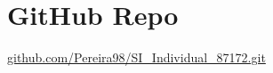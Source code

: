 \documentclass[12pt]{article}
\begin{document}


\tableofcontents 

\newpage


\newpage

\newpage
\section{GitHub Repo}
\href{https://github.com/Pereira98/SI_Individual_87172.git}{github.com/Pereira98/SI\_Individual\_87172.git}
\newpage



\end{document}
